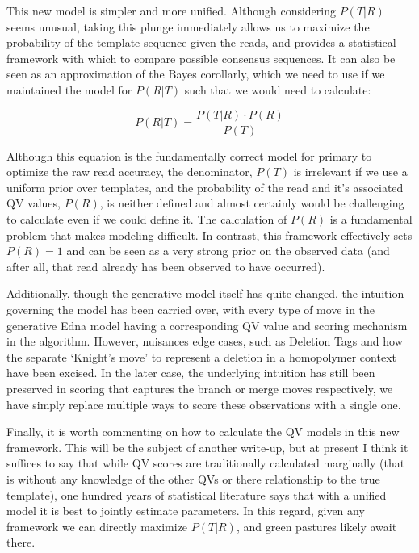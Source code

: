 \documentclass[fleqn,10pt]{SelfArx} %
\begin{document}
This new model is simpler and more unified.  Although considering $P(T|R)$ seems unusual, taking this plunge immediately allows us to maximize the probability of the template sequence given the reads, and provides a statistical framework with which to compare possible consensus sequences.  It can also be seen as an approximation of the Bayes corollarly, which we need to use if we maintained the model for $P(R|T)$ such that we would need to calculate:

\begin{dmath}
P(R|T) = \frac{P(T|R) \cdot P(R)}{P(T)}
\end{dmath}

Although this equation is the fundamentally correct model for primary to optimize the raw read accuracy, the denominator, $P(T)$ is irrelevant if we use a uniform prior over templates, and the probability of the read and it's associated QV values, $P(R)$, is neither defined and almost certainly would be challenging to calculate even if we could define it.  The calculation of $P(R)$ is a fundamental problem that makes modeling difficult.  In contrast, this framework effectively sets $P(R) = 1$ and can be seen as a very strong prior on the observed data (and after all, that read already has been observed to have occurred).  

  Additionally, though the generative model itself has quite changed, the intuition governing the model has been carried over, with every type of move in the generative Edna model having a corresponding QV value and scoring mechanism in the algorithm.  However, nuisances edge cases, such as Deletion Tags and how the separate  `Knight's move' to represent a deletion in a homopolymer context have been excised.   In the later case, the underlying intuition has still been preserved in scoring that captures the branch or merge moves respectively, we have simply replace multiple ways to score these observations with a single one.

Finally, it is worth commenting on how to calculate the QV models in this new framework.  This will be the subject of another write-up, but at present I think it suffices to say that while QV scores are traditionally calculated marginally (that is without any knowledge of the other QVs or there relationship to the true template), one hundred years of statistical literature says that with a unified model it is best to jointly estimate parameters.  In this regard, given any framework we can directly maximize $P(T|R)$, and green pastures likely await there.


    
  

\end{document}
